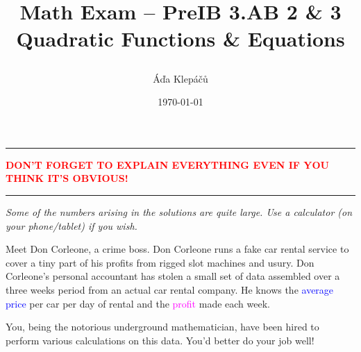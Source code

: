 \documentclass[a4paper,11pt]{article}
\title{\Huge\textsf{Math Exam -- PreIB 3.AB 2 \& 3}\\
 \Large\textsf{Quadratic Functions \& Equations}
 \author{Áďa Klepáčů}
 \date{\today}
}
\newcommand{\clr}{\textcolor{red}}
\newcommand{\clb}{\textcolor{blue}}
\newcommand{\clm}{\textcolor{magenta}}
\begin{document}
\maketitle
\thispagestyle{fancy}

\begin{center}
 \hrule
 \textbf{\clr{DON'T FORGET TO EXPLAIN EVERYTHING EVEN IF YOU THINK IT'S
 OBVIOUS!}}
 \vspace{2ex}
 \hrule
 \emph{Some of the numbers arising in the solutions are quite large. Use a
 calculator (on your phone/tablet) if you wish.}
\end{center}

Meet Don Corleone, a crime boss. Don Corleone runs a fake car rental service to
cover a tiny part of his profits from rigged slot machines and usury. Don
Corleone's personal accountant has stolen a small set of data assembled over a
three weeks period from an actual car rental company. He knows the \clb{average
price} per car per day of rental and the \clm{profit} made each week.

You, being the notorious underground mathematician, have been hired to perform
various calculations on this data. You'd better do your job well!
\end{document}
